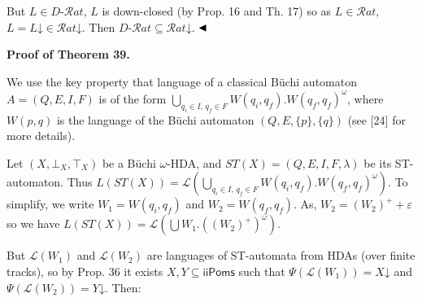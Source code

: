 \documentclass[10pt,a4paper]{article}
\begin{document}
 
 
But $L\in D\text{-}\mathcal{R}at$, $L$ is down-closed (by Prop. 16 and Th. 17) so as $L\in\mathcal{R}at$, $L=L\mathord{\downarrow}\in\mathcal{R}at\mathord{\downarrow}$. Then $D\text{-}\mathcal{R}at\subseteq\mathcal{R}at\mathord{\downarrow}$. $\hfill\blacktriangleleft$\par
 
 
 
 
\par\medskip\noindent\textbf{Proof of Theorem 39.}\par
 
 
We use the key property that language of a classical Büchi automaton $A=(Q,E,I,F)$ is of the form $\bigcup_{q_{i}\in I,\,q_{f}\in F}W(q_{i},q_{f}).W(q_{f},q_{f})^{\omega}$, where $W(p,q)$ is the language of the Büchi automaton $(Q,E,{\{p\}},{\{q\}})$ (see [24] for more details).\par
 
 
 
Let $(X,\bot_{X},\top_{X})$ be a Büchi $\omega$-HDA, and $ST(X)=(Q,E,I,F,\lambda)$ be its ST-automaton. Thus $L(ST(X))=\mathcal{L}(\bigcup_{q_{i}\in I,\,q_{f}\in F}W(q_{i},q_{f}).W(q_{f},q_{f})^{\omega})$. To simplify, we write $W_{1}=W(q_{i},q_{f})$ and $W_{2}=W(q_{f},q_{f})$. As, $W_{2}=(W_{2})^{+}+\varepsilon$ so we have $L(ST(X))=\mathcal{L}(\bigcup W_{1}.((W_{2})^{+})^{\omega})$.\par
 
 
 
But $\mathcal{L}(W_{1})$ and $\mathcal{L}(W_{2})$ are languages of ST-automata from HDAs (over finite tracks), so by Prop. 36 it exists $X,Y\subseteq\mathsf{iiPoms}$ such that $\Psi(\mathcal{L}(W_{1}))=X\mathord{\downarrow}$ and $\Psi(\mathcal{L}(W_{2}))=Y\mathord{\downarrow}$. Then:\par
 
\begin{center}\end{center}
 
\end{document}
